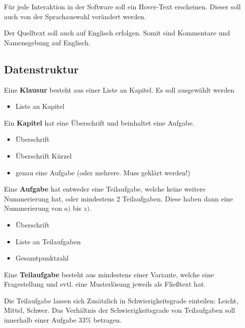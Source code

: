 \documentclass[a4paper]{article}
\begin{document}
Für jede Interaktion in der Software soll ein Hover-Text erscheinen. Dieser soll auch von der Sprachauswahl verändert werden.

Der Quelltext soll auch auf Englisch erfolgen. Somit sind Kommentare und Namensgebung auf Englisch.

\subsection{Datenstruktur}

Eine \textbf{Klausur} besteht aus einer Liste an Kapitel. Es soll ausgewählt werden

\begin{itemize}
    \item Liste an Kapitel
\end{itemize}

Ein \textbf{Kapitel} hat eine Überschrift und beinhaltet eine Aufgabe.

\begin{itemize}
    \item Überschrift
    \item Überschrift Kürzel
    \item genau eine Aufgabe (oder mehrere. Muss geklärt werden!)
\end{itemize}


Eine \textbf{Aufgabe} hat entweder eine Teilaufgabe, welche keine weitere Nummerierung hat, oder mindestens 2 Teilaufgaben. Diese haben dann eine Nummerierung von $a)$ bis $z)$.

\begin{itemize}
    \item Überschrift
    \item Liste an Teilaufgaben
    \item Gesamtpunktzahl
\end{itemize}

Eine \textbf{Teilaufgabe} besteht aus mindestens einer Variante, welche eine Fragestellung und evtl. eine Musterlösung jeweils als Fließtext hat. 

Die Teilaufgabe lassen sich Zusätzlich in Schwierigkeitsgrade einteilen: Leicht, Mittel, Schwer. Das Verhältnis der Schwierigkeitsgrade von Teilaufgaben soll innerhalb einer Aufgabe $33\%$ betragen.
\end{document}
